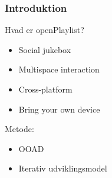 \begin{frame}
	\frametitle{Introduktion}
		Hvad er openPlaylist?
\begin{itemize}
	\item Social jukebox
	\item Multispace interaction
	\item Cross-platform
	\item Bring your own device
\end{itemize}
Metode:
\begin{itemize}
	\item OOAD
	\item Iterativ udviklingsmodel
\end{itemize}

\end{frame}
